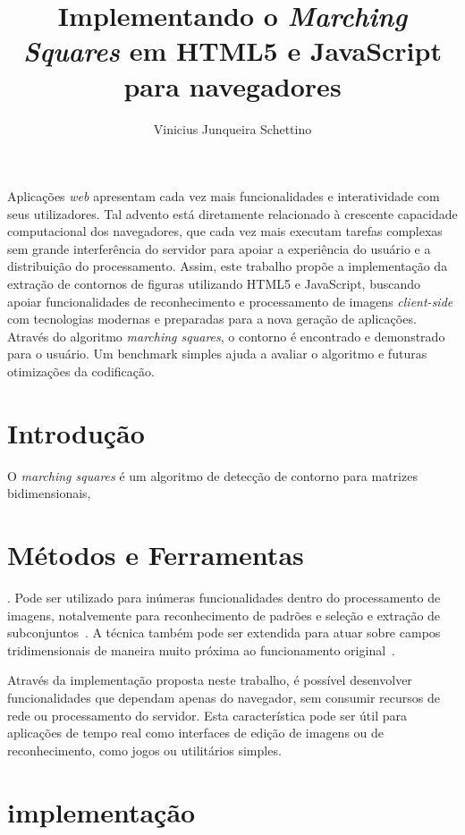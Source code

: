 \documentclass[12pt]{article}
\title{Implementando o \textit{Marching Squares} em HTML5 e JavaScript para navegadores}
\author{Vinicius Junqueira Schettino\inst{1}}
\begin{document}
\maketitle

\begin{resumo}
  Aplicações \textit{web} apresentam cada vez mais funcionalidades e interatividade com seus utilizadores. Tal advento está diretamente relacionado à crescente capacidade computacional dos navegadores, que cada vez mais executam tarefas complexas sem grande interferência do servidor para apoiar a experiência do usuário e a distribuição do processamento. Assim, este trabalho propõe a implementação da extração de contornos de figuras utilizando HTML5 e JavaScript, buscando apoiar funcionalidades de reconhecimento e processamento de imagens \textit{client-side} com tecnologias modernas e preparadas para a nova geração de aplicações. Através do algoritmo \textit{marching squares}, o contorno é encontrado e demonstrado para o usuário. Um benchmark simples ajuda a avaliar o algoritmo e futuras otimizações da codificação.
\end{resumo}


\section{Introdução}

O \textit{marching squares} é um algoritmo de detecção de contorno para matrizes bidimensionais,
\section{Métodos e Ferramentas}\label{sec:firstpage}. Pode ser utilizado para inúmeras funcionalidades dentro do processamento de imagens, notalvemente para reconhecimento de padrões e seleção e extração de subconjuntos~\cite{hanisch2004}. A técnica também pode ser extendida para atuar sobre campos tridimensionais de maneira muito próxima ao funcionamento original~\cite{maple2003}.

Através da implementação proposta neste trabalho, é possível desenvolver funcionalidades que dependam apenas do navegador, sem consumir recursos de rede ou processamento do servidor. Esta característica pode ser útil para aplicações de tempo real como interfaces de edição de imagens ou de reconhecimento, como jogos ou utilitários simples.

\section{implementação}
\end{document}
